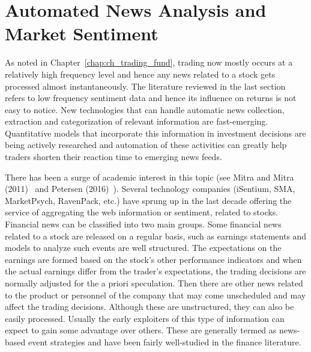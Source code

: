 \section{Automated News Analysis and Market Sentiment}


As noted in Chapter~\ref{chap:ch_trading_fund}, trading now mostly occurs at a relatively high frequency level and hence any news related to a stock gets processed almost instantaneously. The literature reviewed in the last section refers to low frequency sentiment data and hence its influence on returns is not easy to notice. New technologies that can handle automatic news collection, extraction and categorization of relevant information are fast-emerging. Quantitative models that incorporate this information in investment decisions are being actively researched and automation of these activities can greatly help traders shorten their reaction time to emerging news feeds.


There has been a surge of academic interest in this topic (see Mitra and Mitra (2011)~\cite{mitra2} and Petersen (2016)~\cite{peterson}). Several technology companies (iSentium, SMA, MarketPsych, RavenPack, etc.) have sprung up in the last decade offering the service of aggregating the web information or sentiment, related to stocks. Financial news can be classified into two main groups. Some financial news related to a stock are released on a regular basis, such as earnings statements and models to analyze such events are well structured. The expectations on the earnings are formed based on the stock's other performance indicators and when the actual earnings differ from the trader's expectations, the trading decisions are normally adjusted for the a priori speculation. Then there are other news related to the product or personnel of the company that may come unscheduled and may affect the trading decisions. Although these are unstructured, they can also be easily processed. Usually the early exploiters of this type of information can expect to gain some advantage over others. These are generally termed as news-based event strategies and have been fairly well-studied in the finance literature. 


